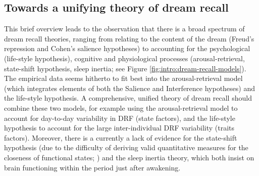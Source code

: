 \subsection{Towards a unifying theory of dream recall}
\label{sec:dream-recall:theories:unifying}

This brief overview leads to the observation that there is a broad spectrum of dream recall theories, ranging from relating to the content of the dream (Freud’s repression and Cohen’s salience hypotheses) to accounting for the psychological (life-style hypothesis), cognitive and physiological processes (arousal-retrieval,  state-shift hypothesis, sleep inertia; see Figure \ref{fig:intro:dream-recall-models}). The empirical data seems hitherto to fit best into the arousal-retrieval model (which integrates elements of both the Salience and Interference hypotheses) and the life-style hypothesis. A comprehensive, unified theory of dream recall should combine these two models, for example using the arousal-retrieval model to account for day-to-day variability in DRF (state factors), and the life-style hypothesis to account for the large inter-individual DRF variability (traits factors). Moreover, there is a currently a lack of evidence for the state-shift hypothesis (due to the difficulty of deriving valid quantitative measures for the closeness of functional states; \citealp{schredl_dream_1999}) and the sleep inertia theory, which both insist on brain functioning within the period just after awakening.

